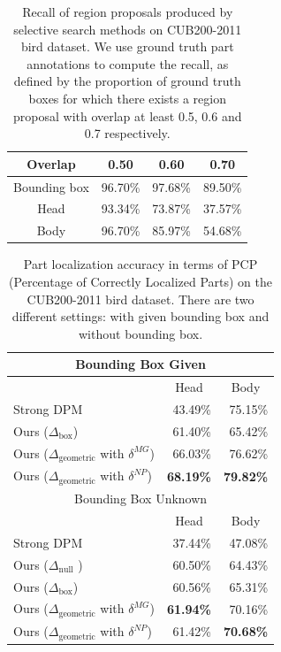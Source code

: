 \begin{table}[t]
\centering
\caption{Recall of region proposals produced by selective search methods on CUB200-2011 bird dataset. We use ground truth part annotations to compute the recall, as defined by the proportion of ground truth boxes for which there exists a region proposal with overlap at least 0.5, 0.6 and 0.7 respectively.}\label{tab:selective_search_recall}
\begin{tabular}{|c|c|c|c|}
\hline
Overlap & 0.50 & 0.60 & 0.70\\
\hline
Bounding box & 96.70\% & 97.68\% & 89.50\% \\
Head &  93.34\% & 73.87\%& 37.57\%\\
Body & 96.70\% & 85.97\%&54.68\%\\
\hline
\end{tabular}
\end{table}

\begin{table}[t]
\centering
\caption{Part localization accuracy in terms of PCP (Percentage of Correctly Localized Parts) on the CUB200-2011 bird dataset. There are two different settings: with given bounding box and without bounding box. } 
\label{tab:partlocalres}
\begin{tabular}{|l|r|r|}
\hline
\multicolumn{3}{|c|}{Bounding Box Given} \\
\hline
& \multicolumn{1}{|c|}{Head}
& \multicolumn{1}{|c|}{Body}
\\
\hline
Strong DPM~\cite{Hossein_ECCV12} & 43.49\% & 75.15\% \\
Ours ($\Delta_{\mathrm{box}}$)   & 61.40\% & 65.42\% \\
Ours ($\Delta_{\mathrm{geometric}}$ with $\delta^{MG}$)& 66.03\% & 76.62\% \\
Ours ($\Delta_{\mathrm{geometric}}$ with $\delta^{NP}$) & \textbf{68.19\%} & \textbf{79.82\%} \\
\hline
\multicolumn{3}{|c|}{Bounding Box Unknown} \\
\hline
& \multicolumn{1}{|c|}{Head}
& \multicolumn{1}{|c|}{Body}
\\
\hline
Strong DPM~\cite{Hossein_ECCV12} & 37.44\% & 47.08\% \\
Ours ($\Delta_{\mathrm{null}}$  ) &60.50\% &  64.43\% \\
Ours ($\Delta_{\mathrm{box}}$)  & 60.56\% & 65.31\% \\
Ours ($\Delta_{\mathrm{geometric}}$ with $\delta^{MG}$)& \textbf{61.94\%} & 70.16\% \\ 
Ours ($\Delta_{\mathrm{geometric}}$ with $\delta^{NP}$) & 61.42\% & \textbf{70.68\%} \\
\hline
\end{tabular}
\end{table}

